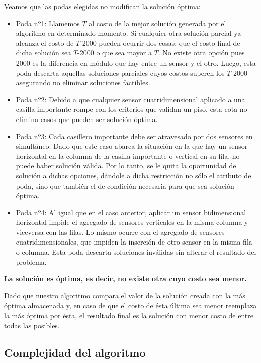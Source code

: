Veamos que las podas elegidas no modifican la solución óptima:
\begin{itemize}
\item Poda nº1: Llamemos $T$ al costo de la mejor solución generada por el algoritmo en determinado momento. Si cualquier otra solución parcial ya alcanza el costo de $T$-2000 pueden ocurrir dos cosas: que el costo final de dicha solución sea $T$-2000 o que sea mayor a $T$. No existe otra opción pues 2000 es la diferencia en módulo que hay entre un sensor y el otro. Luego, esta poda descarta aquellas soluciones parciales cuyos costos superen los $T$-2000 asegurando no eliminar soluciones factibles.  
\item Poda nº2: Debido a que cualquier sensor cuatridimensional aplicado a una casilla importante rompe con los criterios que validan un piso, esta cota no elimina casos que pueden ser solución óptima.
\item Poda nº3: Cada casillero importante debe ser atravesado por dos sensores en simultáneo. Dado que este caso abarca la situación en la que hay un sensor horizontal en la columna de la casilla importante o vertical en su fila, no puede haber solución válida. Por lo tanto, se le quita la oportunidad de solución a dichas opciones, dándole a dicha restricción no sólo el atributo de poda, sino que también el de condición necesaria para que sea solución óptima.
\item Poda nº4: Al igual que en el caso anterior, aplicar un sensor bidimensional horizontal impide el agregado de sensores verticales en la misma columna y viceversa con las filas. Lo mismo ocurre con el agregado de sensores cuatridimensionales, que impiden la inserción de otro sensor en la misma fila o columna. Esta poda descarta soluciones inválidas sin alterar el resultado del problema.
\end{itemize}

\textbf{La solución es óptima, es decir, no existe otra cuyo costo sea menor.} \newline

Dado que nuestro algoritmo compara el valor de la solución creada con la más óptima almacenada y, en caso de que el costo de ésta última sea menor reemplaza la más óptima por ésta, el resultado final es la solución con menor costo de entre todas las posibles.


\subsection{Complejidad del algoritmo}

